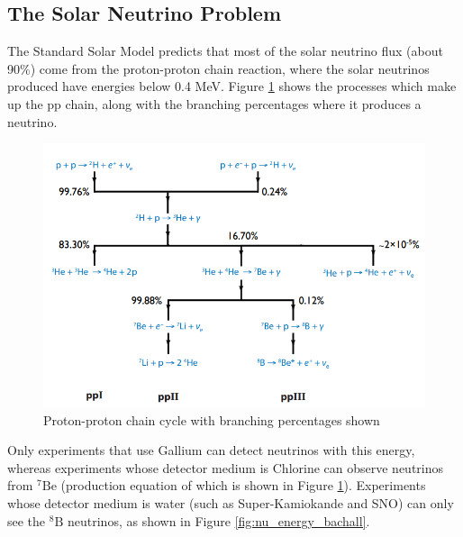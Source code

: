 \subsection{The Solar Neutrino Problem}

The Standard Solar Model predicts that most of the solar neutrino flux (about 90\%) come from the proton-proton chain reaction, where the solar neutrinos produced have energies below 0.4 MeV. Figure \ref{fig:ppchain} shows the processes which make up the pp chain, along with the branching percentages where it produces a neutrino. 

\begin{figure}
    \includegraphics[width=\textwidth]{Figures/ppchain.png}
    \caption{Proton-proton chain cycle with branching percentages shown}
    \label{fig:ppchain}
\end{figure}

Only experiments that use Gallium can detect neutrinos with this energy, whereas experiments whose detector medium is Chlorine can observe neutrinos from ${ }^{7} \mathrm{Be}$ (production equation of which is shown in Figure \ref{fig:ppchain}). Experiments whose detector medium is water (such as Super-Kamiokande and SNO) can only see the ${ }^{8} \mathrm{B}$ neutrinos, as shown in Figure \ref{fig:nu_energy_bachall}.

